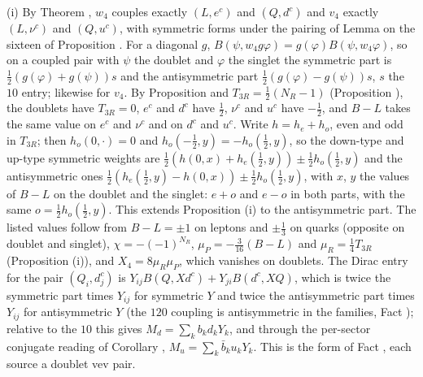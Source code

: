 (i) By Theorem , $w_{4}$ couples exactly $(L, e^{c})$ and $(Q, d^{c})$ and $v_{4}$ exactly $(L, \nu^{c})$ and $(Q, u^{c})$, with symmetric forms under the pairing of Lemma  on the sixteen of Proposition . For a diagonal $g$, $B(\psi, w_{4}g\varphi) = g(\varphi)B(\psi, w_{4}\varphi)$, so on a coupled pair with $\psi$ the doublet and $\varphi$ the singlet the symmetric part is $\tfrac12(g(\varphi) + g(\psi))s$ and the antisymmetric part $\tfrac12(g(\varphi) - g(\psi))s$, $s$ the $10$ entry; likewise for $v_{4}$. By Proposition  and $T_{3R} = \tfrac12(N_{R} - 1)$ (Proposition ), the doublets have $T_{3R} = 0$, $e^{c}$ and $d^{c}$ have $\tfrac12$, $\nu^{c}$ and $u^{c}$ have $-\tfrac12$, and $B - L$ takes the same value on $e^{c}$ and $\nu^{c}$ and on $d^{c}$ and $u^{c}$. Write $h = h_{e} + h_{o}$, even and odd in $T_{3R}$; then $h_{o}(0, \cdot) = 0$ and $h_{o}(-\tfrac12, y) = -h_{o}(\tfrac12, y)$, so the down-type and up-type symmetric weights are $\tfrac12(h(0, x) + h_{e}(\tfrac12, y)) \pm \tfrac12h_{o}(\tfrac12, y)$ and the antisymmetric ones $\tfrac12(h_{e}(\tfrac12, y) - h(0, x)) \pm \tfrac12h_{o}(\tfrac12, y)$, with $x$, $y$ the values of $B - L$ on the doublet and the singlet: $e + o$ and $e - o$ in both parts, with the same $o = \tfrac12h_{o}(\tfrac12, y)$. This extends Proposition (i) to the antisymmetric part. The listed values follow from $B - L = \pm1$ on leptons and $\pm\tfrac13$ on quarks (opposite on doublet and singlet), $\chi = -(-1)^{N_{R}}$, $\mu_{P} = -\tfrac{3}{16}(B - L)$ and $\mu_{R} = \tfrac14T_{3R}$ (Proposition (i)), and $X_{4} = 8\mu_{R}\mu_{P}$, which vanishes on doublets. The Dirac entry for the pair $(Q_{i}, d^{c}_{j})$ is $Y_{ij}B(Q, Xd^{c}) + Y_{ji}B(d^{c}, XQ)$, which is twice the symmetric part times $Y_{ij}$ for symmetric $Y$ and twice the antisymmetric part times $Y_{ij}$ for antisymmetric $Y$ (the $120$ coupling is antisymmetric in the families, Fact ); relative to the $10$ this gives $M_{d} = \sum_{k}b_{k}d_{k}Y_{k}$, and through the per-sector conjugate reading of Corollary , $M_{u} = \sum_{k}\bar{b}_{k}u_{k}Y_{k}$. This is the form of Fact , each source a doublet vev pair.

